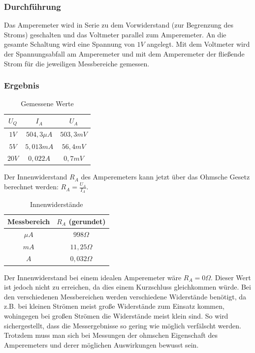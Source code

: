 \documentclass[12pt,a4paper,titlepage]{article}
\begin{document}
\subsubsection{Durchführung}
Das Amperemeter wird in Serie zu dem Vorwiderstand (zur Begrenzung des Stroms) geschalten und das Voltmeter parallel zum Amperemeter. An die gesamte Schaltung wird eine Spannung von $1V$ angelegt. Mit dem Voltmeter wird der Spannungsabfall am Amperemeter und mit dem Amperemeter der fließende Strom für die jeweiligen Messbereiche gemessen.

\subsubsection{Ergebnis}
\begin{table}[H]
  \centering
  \begin{tabular}{c|c|c}
    $U_Q$ & $I_A$ & $U_A$ \\
    \hline
    $1V$ & $504,3\mu A$ & $503,3mV$ \\
    \hline
    $5V$ & $5,013mA$ & $56,4mV$ \\
    \hline
    $20V$ & $0,022A$ & $0,7mV$
  \end{tabular}
  \caption{Gemessene Werte}
\end{table}

\noindent Der Innenwiderstand $R_A$ des Amperemeters kann jetzt über das Ohmsche Gesetz berechnet werden: $R_A = \frac{U_A}{I_A}$.

\begin{table}[H]
  \centering
  \begin{tabular}{c|c}
  Messbereich & $R_A$ (gerundet) \\
  \hline
  $\mu A$ & $998\Omega$ \\
  \hline
  $mA$ & $11,25\Omega$ \\
  \hline
  $A$ & $0,032\Omega$
  \end{tabular}
  \caption{Innenwiderstände}
\end{table}

\noindent Der Innenwiderstand bei einem idealen Amperemeter wäre $R_A = 0\Omega$. Dieser Wert ist jedoch nicht zu erreichen, da dies einem Kurzschluss gleichkommen würde. Bei den verschiedenen Messbereichen werden verschiedene Widerstände benötigt, da z.B. bei kleinen Strömen meist große Widerstände zum Einsatz kommen, wohingegen bei großen Strömen die Widerstände meist klein sind. So wird sichergestellt, dass die Messergebnisse so gering wie möglich verfälscht werden. Trotzdem muss man sich bei Messungen der ohmschen Eigenschaft des Amperemeters und derer möglichen Auswirkungen bewusst sein.
\end{document}
